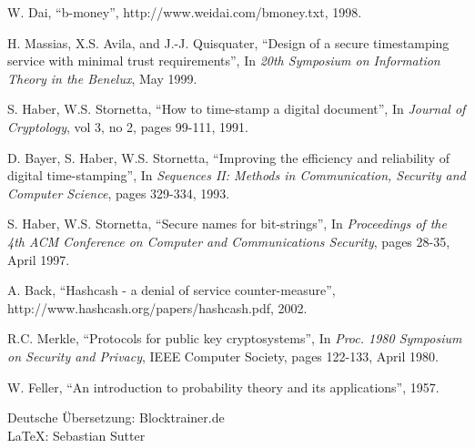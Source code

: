 \documentclass[10pt]{article}
\begin{document}
	\newpage
	
	\begin{thebibliography}{8}
	
		W. Dai, \enquote{b-money}, http://www.weidai.com/bmoney.txt, 1998.
		
		H. Massias, X.S. Avila, and J.-J. Quisquater, \enquote{Design of a secure timestamping service with minimal trust requirements}, In \emph{20th Symposium on Information Theory in the Benelux}, May 1999.
		
		S. Haber, W.S. Stornetta, \enquote{How to time-stamp a digital document}, In \emph{Journal of Cryptology}, vol 3, no 2, pages 99-111, 1991.
		
		D. Bayer, S. Haber, W.S. Stornetta, \enquote{Improving the efficiency and reliability of digital time-stamping}, In \emph{Sequences II: Methods in Communication, Security and Computer Science}, pages 329-334, 1993.
		
		S. Haber, W.S. Stornetta, \enquote{Secure names for bit-strings}, In \emph{Proceedings of the 4th ACM Conference on Computer and Communications Security}, pages 28-35, April 1997.
		
		A. Back, \enquote{Hashcash - a denial of service counter-measure}, \\http://www.hashcash.org/papers/hashcash.pdf, 2002.
		
		R.C. Merkle, \enquote{Protocols for public key cryptosystems}, In \emph{Proc. 1980 Symposium on Security and Privacy}, IEEE Computer Society, pages 122-133, April 1980.
		
		W. Feller, \enquote{An introduction to probability theory and its applications}, 1957.
	\end{thebibliography}
	
	\vfill
	\begin{center}
		\scriptsize{Deutsche Übersetzung: Blocktrainer.de\\ \smallskip \LaTeX: Sebastian Sutter}
	\end{center}
\end{document}
